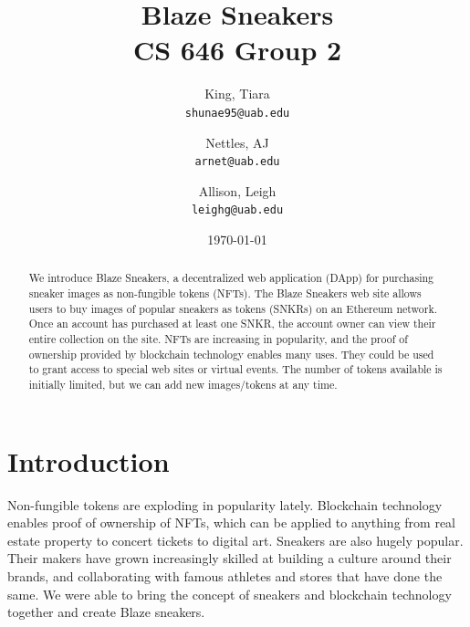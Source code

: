 \documentclass{article}
\begin{document}
\title{Blaze Sneakers\\CS 646 Group 2}
\date{\today}

\author{
  King, Tiara\\
  \texttt{shunae95@uab.edu}
  \and
  Nettles, AJ\\
  \texttt{arnet@uab.edu}
  \and
  Allison, Leigh\\
  \texttt{leighg@uab.edu}
}
\maketitle

\begin{abstract}
\noindent
    We introduce Blaze Sneakers, a decentralized web application (DApp) for purchasing sneaker images as non-fungible tokens (NFTs).
    The Blaze Sneakers web site allows users to buy images of popular sneakers as tokens (SNKRs) on an Ethereum network.
    Once an account has purchased at least one SNKR, the account owner can view their entire collection on the site.
    NFTs are increasing in popularity, and the proof of ownership provided by blockchain technology enables many uses.
    They could be used to grant access to special web sites or virtual events.
    The number of tokens available is initially limited, but we can add new images/tokens at any time.
\end{abstract}


\section{Introduction}
    Non-fungible tokens are exploding in popularity lately.
    Blockchain technology enables proof of ownership of NFTs, which can be applied to anything from 
    real estate property to concert tickets to digital art. 
    Sneakers are also hugely popular. 
    Their makers have grown increasingly skilled at building a culture around their brands, and collaborating with famous 
    athletes and stores that have done the same.
    We were able to bring the concept of sneakers and blockchain technology together and create Blaze sneakers.
\end{document}
